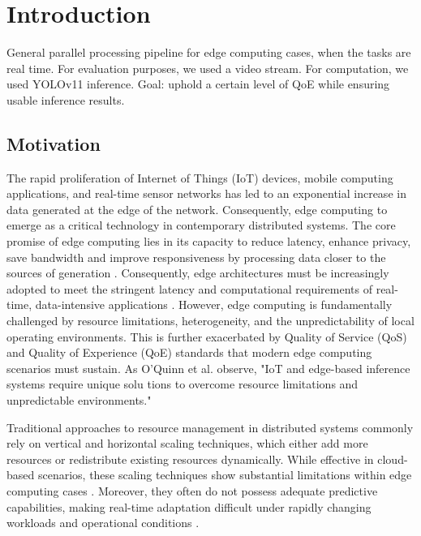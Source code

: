 \chapter{Introduction}
General parallel processing pipeline for edge computing cases, when the tasks are real time. For evaluation purposes, we used a video stream. For computation, we used YOLOv11 inference.
Goal: uphold a certain level of QoE while ensuring usable inference results. \cite{lin_murmuration_2024}

\section{Motivation}
The rapid proliferation of Internet of Things (IoT) devices, mobile computing applications, and real-time sensor networks has led to an exponential increase in data generated at the edge of the network. Consequently, edge computing to emerge as a critical technology in contemporary distributed systems. The core promise of edge computing lies in its capacity to
reduce latency, enhance privacy, save bandwidth and improve responsiveness by processing data closer to the sources of generation \cite{Edge intelligence: The confluence of edge computing and artificial intelligence}. Consequently, edge architectures must be increasingly adopted to meet the
stringent latency and computational requirements of real-time, data-intensive applications \cite{sedlak_active_2024}. However, edge computing is fundamentally challenged by resource limitations, heterogeneity, and the unpredictability of local operating environments. This is further exacerbated by Quality of Service (QoS) and Quality of Experience (QoE) standards that modern edge computing scenarios must sustain. As O’Quinn et al. \cite{oquinn_environment-aware_2025} observe, "IoT and edge-based inference systems require unique solu
tions to overcome resource limitations and unpredictable environments." 

Traditional approaches to resource management in distributed systems commonly rely on
vertical and horizontal scaling techniques, which either add more resources or redistribute
existing resources dynamically. While effective in cloud-based scenarios, these scaling
techniques show substantial limitations within edge computing cases \cite{xu_coscal_2022}. Moreover, they often do not possess adequate predictive capabilities, making real-time
adaptation difficult under rapidly changing workloads and operational conditions \cite{oquinn_environment-aware_2025}.

